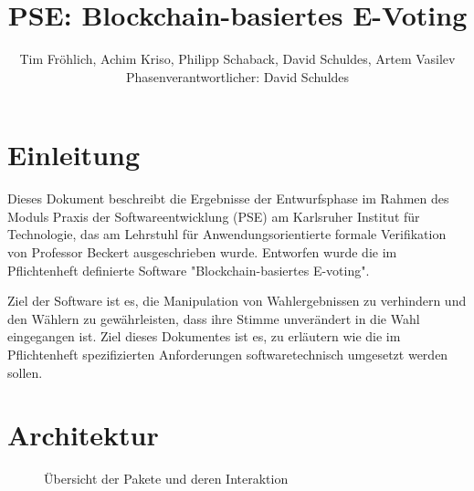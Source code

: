 \documentclass[parskip=full]{scrartcl}
\title{PSE: Blockchain-basiertes E-Voting}
\author{Tim Fröhlich, Achim Kriso, Philipp Schaback, David Schuldes, Artem Vasilev\\ Phasenverantwortlicher: David Schuldes}
\begin{document}
	\clearpage
	\maketitle
	\newpage
	
	\tableofcontents
	\newpage
	\section{Einleitung}
	Dieses Dokument beschreibt die Ergebnisse der Entwurfsphase im Rahmen des Moduls Praxis der Softwareentwicklung (PSE) am Karlsruher Institut für Technologie, das am Lehrstuhl für Anwendungsorientierte formale Verifikation von Professor Beckert ausgeschrieben wurde.
	Entworfen wurde die im Pflichtenheft definierte Software "Blockchain-basiertes E-voting". 
	
	Ziel der Software ist es, die Manipulation
	von Wahlergebnissen zu verhindern und den Wählern zu gewährleisten, dass ihre Stimme unverändert in die Wahl eingegangen ist.
	Ziel dieses Dokumentes ist es, zu erläutern wie die im Pflichtenheft spezifizierten Anforderungen softwaretechnisch umgesetzt werden sollen.
	
	\section{Architektur}
	\begin{figure}[!h]
	\centering
	
	\caption{Übersicht der Pakete und deren Interaktion}
	\end{figure}
\end{document}
